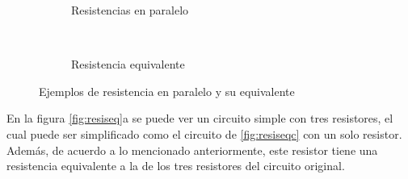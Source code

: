 \begin{figure}[h]
    \centering
    \begin{subfigure}{0.35\textwidth}

        \caption{Resistencias en paralelo}

    \end{subfigure}\hspace{1em}
    \begin{subfigure}{0.35\textwidth}

        \
        \caption{Resistencia equivalente}
    \end{subfigure}


    \caption{Ejemplos de resistencia en paralelo y su equivalente}

    \label{fig:rParalelo}
\end{figure}




En la figura \ref{fig:resiseq}a se puede ver un circuito simple con tres resistores, el cual puede ser simplificado como el circuito de \ref{fig:resiseqc} con un solo resistor. Además, de acuerdo a lo mencionado anteriormente, este resistor tiene una resistencia equivalente a la de los tres resistores del circuito original.

